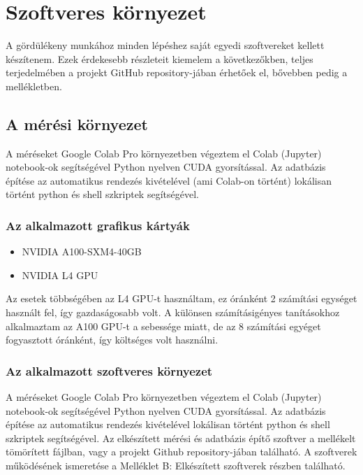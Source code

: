 \chapter{Szoftveres környezet}
    A gördülékeny munkához minden lépéshez saját egyedi szoftvereket kellett készítenem. Ezek érdekesebb részleteit kiemelem a következőkben, teljes terjedelmében a projekt GitHub repository-jában érhetőek el, bővebben pedig a mellékletben.

    \section{A mérési környezet}
    A méréseket Google Colab Pro környezetben végeztem el Colab (Jupyter) notebook-ok segítségével Python nyelven CUDA gyorsítással. Az adatbázis építése az automatikus rendezés kivételével (ami Colab-on történt) lokálisan történt python és shell szkriptek segítségével. 
  
    \subsection{Az alkalmazott grafikus kártyák}
    \begin{itemize}
      \item NVIDIA A100-SXM4-40GB
      \item NVIDIA L4 GPU
    \end{itemize}

    Az esetek többségében az L4 GPU-t használtam, ez óránként 2 számítási egységet használt fel, így gazdaságosabb volt. A különsen számításigényes tanításokhoz alkalmaztam az A100 GPU-t a sebessége miatt, de az 8 számítási egyéget fogyasztott óránként, így költséges volt használni.

  
  \subsection{Az alkalmazott szoftveres környezet}
    A méréseket Google Colab Pro környezetben végeztem el Colab (Jupyter) notebook-ok segítségével Python nyelven CUDA gyorsítással. Az adatbázis építése az automatikus rendezés kivételével lokálisan történt python és shell szkriptek segítségével. 
    Az elkészített mérési és adatbázis építő szoftver a mellékelt tömörített fájlban, vagy a projekt Github repository-jában található.
    A szoftverek működésének ismeretése a Melléklet B: Elkészített szoftverek részben található.

